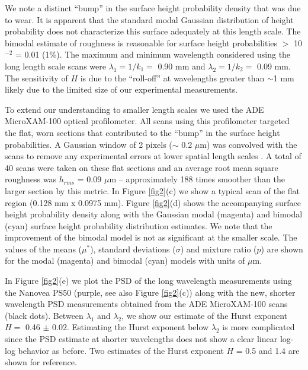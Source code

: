 \documentclass[draft]{agujournal2019}
\begin{document}
We note a distinct ``bump'' in the surface height probability density that was due to wear.  It is apparent that the standard modal Gaussian distribution of height probability does not characterize this surface adequately at this length scale. The bimodal estimate of roughness is reasonable for surface height probabilities $>$ 10$^{-2}$ = 0.01 (1\%). The maximum and minimum wavelength considered using the long length scale scans were $\lambda_{1} = 1/k_{1} =$  0.90 mm and $\lambda_{2} = 1/k_{2}=$ 0.09 mm. The sensitivity of $H$ is due to the ``roll-off'' at wavelengths greater than $\sim$1 mm likely due to the limited size of our experimental measurements. 

To extend our understanding to smaller length scales we used the ADE MicroXAM-100 optical profilometer. All scans using this profilometer targeted the flat, worn sections that contributed to the ``bump'' in the surface height probabilities.  A Gaussian window of 2 pixels ($\sim$ 0.2 $\mu$m) was convolved with the scans to remove any experimental errors at lower spatial length scales \cite{Candela2009}.  A total of 40 scans were taken on these flat sections and an average root mean square roughness was $h_{rms}$ = 0.09 $\mu$m  -- approximately 188 times smoother than the larger section by this metric.  In Figure \ref{fig2}(c) we show a typical scan of the flat region (0.128 mm x 0.0975 mm).    Figure \ref{fig2}(d) shows the accompanying surface height probability density along with the Gaussian modal (magenta) and bimodal (cyan) surface height probability distribution estimates.  We note that the improvement of the bimodal model is not as significant at the smaller scale. The values of the means ($\mu^{*}$), standard deviations ($\sigma$) and mixture ratio ($p$) are shown for the modal (magenta) and bimodal (cyan) models with units of $\mu$m.

In Figure \ref{fig2}(e) we plot the PSD of the long wavelength measurements using the Nanovea PS50 (purple, see also Figure \ref{fig2}(c)) along with the new, shorter wavelength PSD measurements obtained from the ADE MicroXAM-100 scans (black dots).  Between $\lambda_{1}$ and $\lambda_{2}$, we show our estimate of the Hurst exponent $H = $ 0.46 $\pm$ 0.02.  Estimating the Hurst exponent below $\lambda_{2}$ is more complicated since the PSD estimate at shorter wavelengths does not show a clear linear log-log behavior as before.  Two estimates of the Hurst exponent $H$ = 0.5 and 1.4 are shown for reference.  

\end{document}
